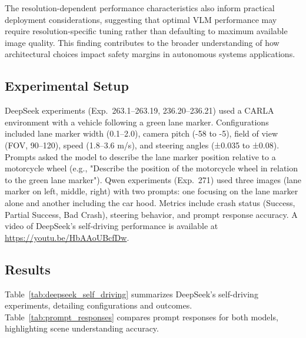 The resolution-dependent performance characteristics also inform practical deployment considerations, suggesting that optimal VLM performance may require resolution-specific tuning rather than defaulting to maximum available image quality. This finding contributes to the broader understanding of how architectural choices impact safety margins in autonomous systems applications.


\subsection{Experimental Setup}
DeepSeek experiments (Exp.~263.1--263.19, 236.20--236.21) used a CARLA environment with a vehicle following a green lane marker. Configurations included lane marker width (0.1--2.0), camera pitch (-58 to -5), field of view (FOV, 90--120), speed (1.8--3.6 m/s), and steering angles (±0.035 to ±0.08). Prompts asked the model to describe the lane marker position relative to a motorcycle wheel (e.g., "Describe the position of the motorcycle wheel in relation to the green lane marker"). Qwen experiments (Exp.~271) used three images (lane marker on left, middle, right) with two prompts: one focusing on the lane marker alone and another including the car hood. Metrics include crash status (Success, Partial Success, Bad Crash), steering behavior, and prompt response accuracy. A video of DeepSeek's self-driving performance is available at \url{https://youtu.be/HbAAoUBcfDw}.


\subsection{Results}
Table~\ref{tab:deepseek_self_driving} summarizes DeepSeek's self-driving experiments, detailing configurations and outcomes. Table~\ref{tab:prompt_responses} compares prompt responses for both models, highlighting scene understanding accuracy.

